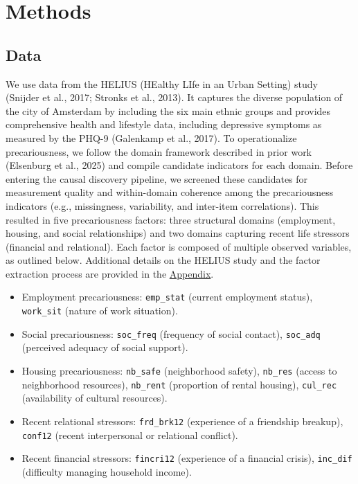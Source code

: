 \documentclass[
]{article}
\providecommand{\tightlist}{%
  \setlength{\itemsep}{0pt}\setlength{\parskip}{0pt}}\usepackage{longtable,booktabs,array}
\begin{document}
\section{Methods}\label{methods}

\subsection{Data}\label{data}

We use data from the HELIUS (HEalthy LIfe in an Urban Setting) study
(Snijder et al., 2017; Stronks et al., 2013). It captures the diverse
population of the city of Amsterdam by including the six main ethnic
groups and provides comprehensive health and lifestyle data, including
depressive symptoms as measured by the PHQ-9 (Galenkamp et al., 2017).
To operationalize precariousness, we follow the domain framework
described in prior work (Elsenburg et al., 2025) and compile candidate
indicators for each domain. Before entering the causal discovery
pipeline, we screened these candidates for measurement quality and
within-domain coherence among the precariousness indicators (e.g.,
missingness, variability, and inter-item correlations). This resulted in
five precariousness factors: three structural domains (employment,
housing, and social relationships) and two domains capturing recent life
stressors (financial and relational). Each factor is composed of
multiple observed variables, as outlined below. Additional details on
the HELIUS study and the factor extraction process are provided in the
\hyperref[sec-appendix]{Appendix}.

\begin{itemize}
\tightlist
\item
  Employment precariousness: \texttt{emp\_stat} (current employment
  status), \texttt{work\_sit} (nature of work situation).
\item
  Social precariousness: \texttt{soc\_freq} (frequency of social
  contact), \texttt{soc\_adq} (perceived adequacy of social support).
\item
  Housing precariousness: \texttt{nb\_safe} (neighborhood safety),
  \texttt{nb\_res} (access to neighborhood resources), \texttt{nb\_rent}
  (proportion of rental housing), \texttt{cul\_rec} (availability of
  cultural resources).
\item
  Recent relational stressors: \texttt{frd\_brk12} (experience of a
  friendship breakup), \texttt{conf12} (recent interpersonal or
  relational conflict).
\item
  Recent financial stressors: \texttt{fincri12} (experience of a
  financial crisis), \texttt{inc\_dif} (difficulty managing household
  income).
\end{itemize}
\end{document}
